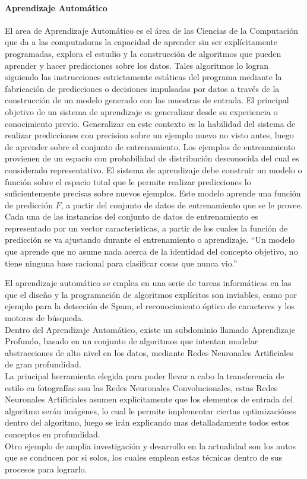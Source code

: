 \documentclass[a4paper,11pt,spanish]{book}
\begin{document}
    \paragraph{Aprendizaje Automático}
      El area de Aprendizaje Automático es el área de las Ciencias de la Computación que da a las computadoras la capacidad de aprender sin ser explícitamente programadas, explora el estudio
      y la construcción de algoritmos que pueden aprender y hacer predicciones sobre los datos. Tales algoritmos lo logran siguiendo las instrucciones estrictamente estáticas del programa
      mediante la fabricación de predicciones o decisiones impulsadas por datos​ a través de la construcción de un modelo generado con las muestras de entrada. 
      El principal objetivo de un sistema de aprendizaje es generalizar desde su experiencia o conocimiento previo. Generalizar en este contexto es la habilidad del sistema de realizar
      predicciones con precision sobre un ejemplo nuevo no visto antes, luego de aprender sobre el conjunto de entrenamiento. Los ejemplos de entrenamiento provienen de un espacio
      con probabilidad de distribución desconocida del cual es considerado representativo. El sistema de aprendizaje debe construir un modelo o función sobre el espacio total que le permite realizar
      predicciones lo suficientemente precisas sobre nuevos ejemplos. Este modelo aprende una función de predicción $F$, a partir del conjunto de datos de entrenamiento que se le provee.
      Cada una de las instancias del conjunto de datos de entrenamiento es representado por un vector caracteristicas, a partir de los cuales la función de predicción 
      se va ajustando durante el entrenamiento o aprendizaje. 
      “Un modelo que aprende que no asume nada acerca de la identidad del concepto objetivo, no tiene ninguna base racional para clasificar cosas que nunca vio.” \cite{Mitchell:1997:ML:541177}

      El aprendizaje automático se emplea en una serie de tareas informáticas en las que el diseño y la programación de algoritmos explícitos son inviables, como por ejemplo para la detección de Spam, el reconocimiento
      óptico de caracteres y los motores de búsqueda.\\
      Dentro del Aprendizaje Automático, existe un subdominio llamado Aprendizaje Profundo, basado en un conjunto de algoritmos que intentan modelar abstracciones de alto nivel en los datos,
      mediante Redes Neuronales Artificiales de gran profundidad.\\
      La principal herramienta elegida para poder llevar a cabo la transferencia de estilo en fotografías son las Redes Neuronales Convolucionales, estas Redes Neuronales Artificiales asumen
      explicitamente que los elementos de  entrada del algoritmo serán imágenes, lo cual le permite implementar ciertas optimizaciónes dentro del algoritmo, luego
      se irán explicando mas detalladamente todos estos conceptos en profundidad.\\
      Otro ejemplo de amplia investigación y desarrollo en la actualidad son los autos que se conducen por si solos, los cuales emplean estas técnicas dentro de sus procesos para lograrlo.\\
    
\end{document}
